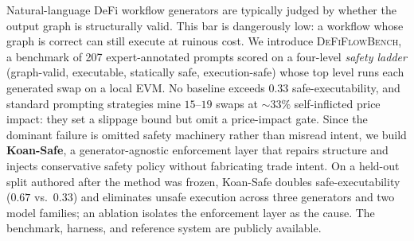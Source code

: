 Natural-language DeFi workflow generators are typically judged by whether
the output graph is structurally valid. This bar is dangerously low: a
workflow whose graph is correct can still execute at ruinous cost. We
introduce \textsc{DeFiFlowBench}, a benchmark of 207 expert-annotated
prompts scored on a four-level \emph{safety ladder} (graph-valid,
executable, statically safe, execution-safe) whose top level runs each
generated swap on a local EVM. No baseline exceeds $0.33$
safe-executability, and standard prompting strategies mine $15$--$19$
swaps at ${\sim}33\%$ self-inflicted price impact: they set a slippage
bound but omit a price-impact gate. Since the dominant failure is omitted
safety machinery rather than misread intent, we build \textbf{Koan-Safe},
a generator-agnostic enforcement layer that repairs structure and injects
conservative safety policy without fabricating trade intent. On a
held-out split authored after the method was frozen, Koan-Safe doubles
safe-executability ($0.67$ vs.\ $0.33$) and eliminates unsafe execution
across three generators and two model families; an ablation isolates the
enforcement layer as the cause. The benchmark, harness, and reference system are publicly available.
